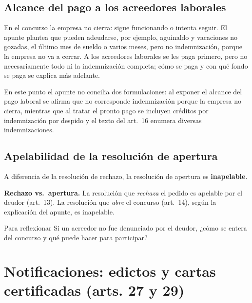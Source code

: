 \documentclass[12pt,oneside]{book}
\begin{document}
\subsection{Alcance del pago a los acreedores laborales}

En el concurso la empresa no cierra: sigue funcionando o intenta seguir. El apunte plantea que pueden adeudarse, por ejemplo, aguinaldo y vacaciones no gozadas, el último mes de sueldo o varios meses, pero no indemnización, porque la empresa no va a cerrar. A los acreedores laborales se les paga primero, pero no necesariamente todo ni la indemnización completa; cómo se paga y con qué fondo se paga se explica más adelante.

\begin{note}
En este punto el apunte no concilia dos formulaciones: al exponer el alcance del pago laboral se afirma que no corresponde indemnización porque la empresa no cierra, mientras que al tratar el pronto pago se incluyen créditos por indemnización por despido y el texto del art.~16 enumera diversas indemnizaciones.
\end{note}

\subsection{Apelabilidad de la resolución de apertura}

A diferencia de la resolución de rechazo, la resolución de apertura es \textbf{inapelable}.

\begin{important}
\textbf{Rechazo vs.\ apertura.} La resolución que \textit{rechaza} el pedido es apelable por el deudor (art.~13). La resolución que \textit{abre} el concurso (art.~14), según la explicación del apunte, es inapelable.
\end{important}

\begin{exercise}{Para reflexionar}
Si un acreedor no fue denunciado por el deudor, ¿cómo se entera del concurso y qué puede hacer para participar?
\end{exercise}

\section{Notificaciones: edictos y cartas certificadas (arts. 27 y 29)}
\end{document}
